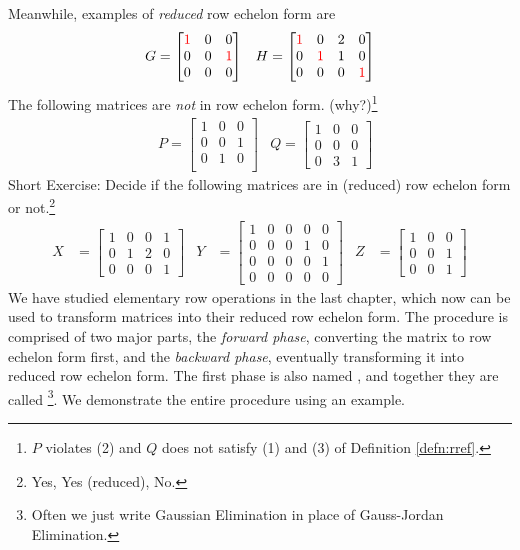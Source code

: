 Meanwhile, examples of \textit{reduced} row echelon form are
\begin{align*}
& G =
\begin{bmatrix}
\textcolor{red}{1} & 0 & 0 \\
0 & 0 & \textcolor{red}{1}\\
0 & 0 & 0 
\end{bmatrix}
& H =
\begin{bmatrix}
\textcolor{red}{1} & 0 & 2 & 0 \\
0 & \textcolor{red}{1} & 1 & 0 \\
0 & 0 & 0 & \textcolor{red}{1}
\end{bmatrix}
\end{align*}
The following matrices are \textit{not} in row echelon form. (why?)\footnote{$P$ violates (2) and $Q$ does not satisfy (1) and (3) of Definition \ref{defn:rref}.}
\begin{align*}
& P =
\begin{bmatrix}
1 & 0 & 0 \\
0 & 0 & 1 \\
0 & 1 & 0 \\
\end{bmatrix}
& Q =
\begin{bmatrix}
1 & 0 & 0 \\
0 & 0 & 0 \\
0 & 3 & 1
\end{bmatrix}
\end{align*}
Short Exercise: Decide if the following matrices are in (reduced) row echelon form or not.\footnote{Yes, Yes (reduced), No.}
\begin{align*}
X &= 
\begin{bmatrix}
1 & 0 & 0 & 1 \\
0 & 1 & 2 & 0 \\
0 & 0 & 0 & 1
\end{bmatrix}
& Y&=
\begin{bmatrix}
1 & 0 & 0 & 0 & 0 \\
0 & 0 & 0 & 1 & 0 \\
0 & 0 & 0 & 0 & 1 \\
0 & 0 & 0 & 0 & 0
\end{bmatrix}
& Z&=
\begin{bmatrix}
1 & 0 & 0 \\
0 & 0 & 1 \\
0 & 0 & 1 
\end{bmatrix}
\end{align*}
We have studied elementary row operations in the last chapter, which now can be used to transform matrices into their reduced row echelon form. The procedure is comprised of two major parts, the \textit{forward phase}, converting the matrix to row echelon form first, and the \textit{backward phase}, eventually transforming it into reduced row echelon form. The first phase is also named , and together they are called \footnote{Often we just write Gaussian Elimination in place of Gauss-Jordan Elimination.}. We demonstrate the entire procedure using an example.
